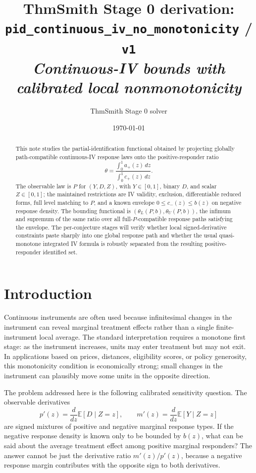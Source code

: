 \documentclass[11pt]{article}
\title{ThmSmith Stage 0 derivation: \texttt{pid\_continuous\_iv\_no\_monotonicity} / \texttt{v1}%
  \\ \large\textit{Continuous-IV bounds with calibrated local nonmonotonicity}}
\author{ThmSmith Stage 0 solver}
\date{\today}
\newcommand{\E}{\mathbb{E}}
\theoremstyle{definition}
\theoremstyle{plain}
\theoremstyle{remark}
\begin{document}
\maketitle


\begin{abstract}
This note studies the partial-identification functional obtained by projecting
globally path-compatible continuous-IV response laws onto the positive-responder
ratio
\[
\theta=\frac{\int_0^1 a_+(z)\,dz}{\int_0^1 c_+(z)\,dz}.
\]
The observable law is \(P\) for \((Y,D,Z)\), with \(Y\in[0,1]\), binary
\(D\), and scalar \(Z\in[0,1]\); the maintained restrictions are IV
validity, exclusion, differentiable reduced forms, full level matching to
\(P\), and a known envelope \(0\le c_-(z)\le b(z)\) on negative response
density.  The bounding functional is
\((\theta_L(P,b),\theta_U(P,b))\), the infimum and supremum of the same
ratio over all full-\(P\)-compatible response paths satisfying the envelope.
The per-conjecture stages will verify whether local signed-derivative
constraints paste sharply into one global response path and whether the usual
quasi-monotone integrated IV formula is robustly separated from the resulting
positive-responder identified set.
\end{abstract}

\section{Introduction}
Continuous instruments are often used because infinitesimal changes in the
instrument can reveal marginal treatment effects rather than a single
finite-instrument local average.  The standard interpretation requires a
monotone first stage: as the instrument increases, units may enter treatment
but may not exit.  In applications based on prices, distances, eligibility
scores, or policy generosity, this monotonicity condition is economically
strong; small changes in the instrument can plausibly move some units in the
opposite direction.

The problem addressed here is the following calibrated sensitivity question.
The observable derivatives
\[
p'(z)=\frac{d}{dz}\E[D\mid Z=z],
\qquad
m'(z)=\frac{d}{dz}\E[Y\mid Z=z]
\]
are signed mixtures of positive and negative marginal response types.  If the
negative response density is known only to be bounded by \(b(z)\), what can be
said about the average treatment effect among positive marginal responders?
The answer cannot be just the derivative ratio \(m'(z)/p'(z)\), because a
negative response margin contributes with the opposite sign to both derivatives.
\end{document}

